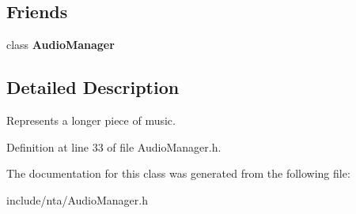 \subsection*{Friends}
\begin{DoxyCompactItemize}
\item 
\mbox{\label{classnta_1_1Music_a85edaa7e5c3ae68dabadd5373890591e}} 
class {\bfseries Audio\+Manager}
\end{DoxyCompactItemize}


\subsection{Detailed Description}
Represents a longer piece of music. 

Definition at line 33 of file Audio\+Manager.\+h.



The documentation for this class was generated from the following file\+:\begin{DoxyCompactItemize}
\item 
include/nta/Audio\+Manager.\+h\end{DoxyCompactItemize}
